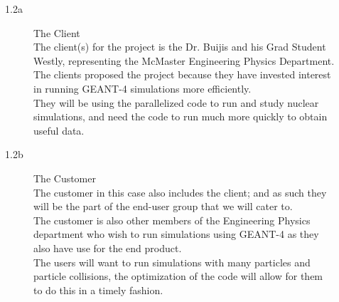 \documentclass[12pt]{article}
\begin{document}
\begin{description}
\item[]\indent
\begin{description}
 	\item[1.2a] The Client \\
	The client(s) for the project is the Dr. Buijis and his Grad Student Westly, representing the McMaster Engineering Physics Department.\\
	The clients proposed the project because they have invested interest in running GEANT-4 simulations more efficiently. \\
	They will be using the parallelized code to run and study nuclear simulations, and need the code to run much more quickly to 			obtain useful data. \\
	
  \item[1.2b]The Customer \\
	The customer in this case also includes the client; and as such they will be the part of the end-user group that we will cater to.\\
	The customer is also other members of the Engineering Physics department who wish to run simulations using GEANT-4 as they 		also have use for the end product. \\
	The users will want to run simulations with many particles and particle collisions, the optimization of the code will allow for 			them to do this in a timely fashion. \\	
	

\end{description}
\end{description}
\end{document}
